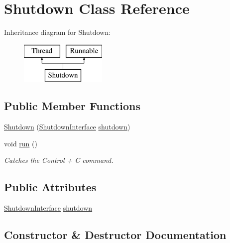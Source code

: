 \hypertarget{class_shutdown}{}\section{Shutdown Class Reference}
\label{class_shutdown}
Inheritance diagram for Shutdown\+:\begin{figure}[H]
\begin{center}
\leavevmode
\includegraphics[height=2.000000cm]{class_shutdown}
\end{center}
\end{figure}
\subsection*{Public Member Functions}
\begin{DoxyCompactItemize}
\item 
\hyperlink{class_shutdown_a9753237b650b81387f45cb771f0da612}{Shutdown} (\hyperlink{interface_shutdown_interface}{Shutdown\+Interface} \hyperlink{class_shutdown_a8ed6d4f262656f4f6b5e30b8da025e0a}{shutdown})
\item 
void \hyperlink{class_shutdown_a5044221edbe8af603a9874518074b38d}{run} ()
\begin{DoxyCompactList}\small\item\em Catches the Control + C command. \end{DoxyCompactList}\end{DoxyCompactItemize}
\subsection*{Public Attributes}
\begin{DoxyCompactItemize}
\item 
\hyperlink{interface_shutdown_interface}{Shutdown\+Interface} \hyperlink{class_shutdown_a8ed6d4f262656f4f6b5e30b8da025e0a}{shutdown}
\end{DoxyCompactItemize}


\subsection{Constructor \& Destructor Documentation}
\hypertarget{class_shutdown_a9753237b650b81387f45cb771f0da612}{}\label{class_shutdown_a9753237b650b81387f45cb771f0da612} 
